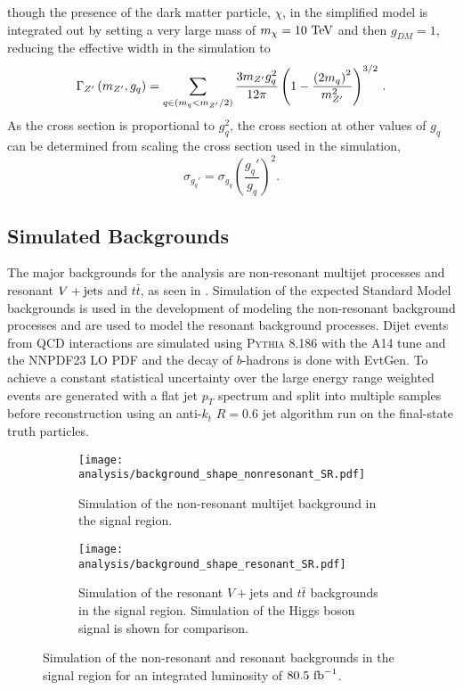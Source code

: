 though the presence of the dark matter particle, $\chi$, in the simplified model is integrated out by setting a very large mass of $m_{\chi} = 10~\mathrm{TeV}$ and then $g_{DM} = 1$, reducing the effective width in the simulation to
\[
 \Gamma_{Z^{\prime}}\left(m_{Z^{\prime}}, g_{q}\right) = \sum_{q \in \left(m_{q} < m_{Z^{\prime}}/2\right)} \frac{3 m_{Z^{\prime}} g_{q}^{2}}{12 \pi} \left(1 - \frac{\left(2m_{q}\right)^{2}}{m_{Z^{\prime}}^{2}}\right)^{3/2}\,.
\]
As the cross section is proportional to $g_{q}^2$, the cross section at other values of $g_{q}$ can be determined from scaling the cross section used in the simulation,
\begin{equation}
 \sigma_{g_{q}'} = \sigma_{g_{q}} \left(\frac{g_{q}'}{g_{q}}\right)^{2}.
 \label{eq:g_q_scaling}
\end{equation}

\subsection{Simulated Backgrounds}\label{sec:simulation_background}

The major backgrounds for the analysis are non-resonant multijet processes and resonant $V + \text{jets}{}$ and $t\bar{t}$, as seen in .
Simulation of the expected Standard Model backgrounds is used in the development of modeling the non-resonant background processes and are used to model the resonant background processes.
Dijet events from QCD interactions are simulated using \textsc{Pythia 8.186} with the A14 tune and the NNPDF23 LO PDF and the decay of $b$-hadrons is done with EvtGen.
To achieve a constant statistical uncertainty over the large energy range weighted events are generated with a flat jet $p_{T}$ spectrum and split into multiple samples before reconstruction using an anti-$k_{t}$ $R=0.6$ jet algorithm run on the final-state truth particles.

\begin{figure}[htbp]
 \centering
 \begin{subfigure}[t]{0.48\textwidth}
  \centering
  \texttt{[image: analysis/background\_shape\_nonresonant\_SR.pdf]}
  \caption[Simulation of the non-resonant multijet background in the signal region.]{%
   Simulation of the non-resonant multijet background in the signal region.}
  \label{fig:background_shape_nonresonant_SR}
 \end{subfigure}%
 \quad
 \begin{subfigure}[t]{0.48\textwidth}
  \centering
  \texttt{[image: analysis/background\_shape\_resonant\_SR.pdf]}
  \caption[Simulation of the resonant backgrounds in the signal region.]{%
   Simulation of the resonant {$V+\mathrm{jets}$} and $t\bar{t}$ backgrounds in the signal region.
   Simulation of the Higgs boson signal is shown for comparison.}
  \label{fig:background_shape_resonant_SR}
 \end{subfigure}
 \caption[Results of the likelihood ratio test and $F$-test of comparing the polynomial exponential fit models.]{%
  Simulation of the non-resonant and resonant backgrounds in the signal region for an integrated luminosity of $80.5~\mathrm{fb}^{-1}$.}
 \label{fig:background_shape_SR}
\end{figure}


